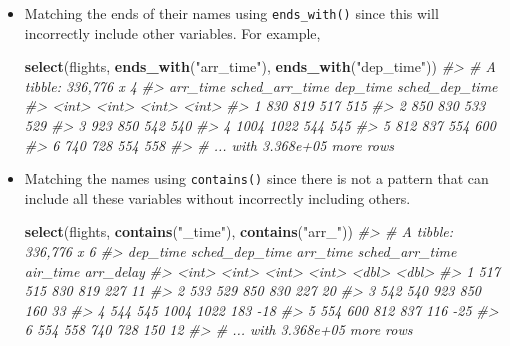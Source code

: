 \documentclass[]{book}
\newenvironment{Shaded}{\begin{snugshade}}{\end{snugshade}}
\newcommand{\CommentTok}[1]{\textcolor[rgb]{0.56,0.35,0.01}{\textit{#1}}}
\newcommand{\KeywordTok}[1]{\textcolor[rgb]{0.13,0.29,0.53}{\textbf{#1}}}
\newcommand{\NormalTok}[1]{#1}
\newcommand{\StringTok}[1]{\textcolor[rgb]{0.31,0.60,0.02}{#1}}
\theoremstyle{plain}
\theoremstyle{remark}
\begin{document}
\begin{itemize}
\item
  Matching the ends of their names using \texttt{ends\_with()} since this will incorrectly
  include other variables. For example,

\begin{Shaded}
\begin{Highlighting}[]
\KeywordTok{select}\NormalTok{(flights, }\KeywordTok{ends_with}\NormalTok{(}\StringTok{"arr_time"}\NormalTok{), }\KeywordTok{ends_with}\NormalTok{(}\StringTok{"dep_time"}\NormalTok{))}
\CommentTok{#> # A tibble: 336,776 x 4}
\CommentTok{#>   arr_time sched_arr_time dep_time sched_dep_time}
\CommentTok{#>      <int>          <int>    <int>          <int>}
\CommentTok{#> 1      830            819      517            515}
\CommentTok{#> 2      850            830      533            529}
\CommentTok{#> 3      923            850      542            540}
\CommentTok{#> 4     1004           1022      544            545}
\CommentTok{#> 5      812            837      554            600}
\CommentTok{#> 6      740            728      554            558}
\CommentTok{#> # ... with 3.368e+05 more rows}
\end{Highlighting}
\end{Shaded}
\item
  Matching the names using \texttt{contains()} since there is not a pattern that can
  include all these variables without incorrectly including others.

\begin{Shaded}
\begin{Highlighting}[]
\KeywordTok{select}\NormalTok{(flights, }\KeywordTok{contains}\NormalTok{(}\StringTok{"_time"}\NormalTok{), }\KeywordTok{contains}\NormalTok{(}\StringTok{"arr_"}\NormalTok{))}
\CommentTok{#> # A tibble: 336,776 x 6}
\CommentTok{#>   dep_time sched_dep_time arr_time sched_arr_time air_time arr_delay}
\CommentTok{#>      <int>          <int>    <int>          <int>    <dbl>     <dbl>}
\CommentTok{#> 1      517            515      830            819      227        11}
\CommentTok{#> 2      533            529      850            830      227        20}
\CommentTok{#> 3      542            540      923            850      160        33}
\CommentTok{#> 4      544            545     1004           1022      183       -18}
\CommentTok{#> 5      554            600      812            837      116       -25}
\CommentTok{#> 6      554            558      740            728      150        12}
\CommentTok{#> # ... with 3.368e+05 more rows}
\end{Highlighting}
\end{Shaded}
\end{itemize}
\end{document}
